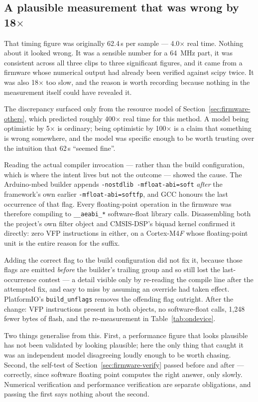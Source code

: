 \documentclass[11pt]{article}
\begin{document}
\subsection{A plausible measurement that was wrong by 18$\times$}
\label{sec:firmware-fpu}

That timing figure was originally 62.4\,\textmu s per sample --- 4.0$\times$
real time. Nothing about it looked wrong. It was a sensible number for a
64~MHz part, it was consistent across all three clips to three significant
figures, and it came from a firmware whose numerical output had already been
verified against scipy twice. It was also 18$\times$ too slow, and the reason
is worth recording because nothing in the measurement itself could have
revealed it.

The discrepancy surfaced only from the resource model of
Section~\ref{sec:firmware-others}, which predicted roughly 400$\times$ real
time for this method. A model being optimistic by 5$\times$ is ordinary; being
optimistic by 100$\times$ is a claim that something is wrong somewhere, and the
model was specific enough to be worth trusting over the intuition that
62\,\textmu s ``seemed fine''.

Reading the actual compiler invocation --- rather than the build
configuration, which is where the intent lives but not the outcome --- showed
the cause. The Arduino-mbed builder appends \texttt{-nostdlib
-mfloat-abi=soft} \emph{after} the framework's own earlier
\texttt{-mfloat-abi=softfp}, and GCC honours the last occurrence of that
flag. Every floating-point operation in the firmware was therefore compiling
to \texttt{\_\_aeabi\_*} software-float library calls. Disassembling both the
project's own filter object and CMSIS-DSP's biquad kernel confirmed it
directly: zero VFP instructions in either, on a Cortex-M4\emph{F} whose
floating-point unit is the entire reason for the suffix.

Adding the correct flag to the build configuration did not fix it, because
those flags are emitted \emph{before} the builder's trailing group and so
still lost the last-occurrence contest --- a detail visible only by
re-reading the compile line after the attempted fix, and easy to miss by
assuming an override had taken effect. PlatformIO's \texttt{build\_unflags}
removes the offending flag outright. After the change: VFP instructions
present in both objects, no software-float calls, 1{,}248 fewer bytes of
flash, and the re-measurement in Table~\ref{tab:ondevice}.

Two things generalise from this. First, a performance figure that looks
plausible has not been validated by looking plausible; here the only thing
that caught it was an independent model disagreeing loudly enough to be worth
chasing. Second, the self-test of Section~\ref{sec:firmware-verify} passed
before and after --- correctly, since software floating point computes the
right answer, only slowly. Numerical verification and performance
verification are separate obligations, and passing the first says nothing
about the second.
\end{document}
